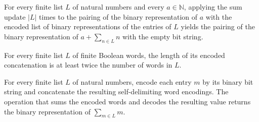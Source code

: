 \begin{theorem}
\label{Randomized.BPLInP.iterate_sumStep_encWords}
\leanok
{}
For every finite list $L$ of natural numbers and every $a\in\mathbb N$, applying the sum
update $|L|$ times to the pairing of the binary representation of $a$ with the encoded
list of binary representations of the entries of $L$ yields the pairing of the binary
representation of $a+\sum_{n\in L}n$ with the empty bit string.
\end{theorem}

\begin{theorem}
\label{Randomized.BPLInP.two_mul_length_le_encWords}
\leanok
{}
For every finite list $L$ of finite Boolean words, the length of its encoded
concatenation is at least twice the number of words in $L$.
\end{theorem}

\begin{theorem}
\label{Randomized.BPLInP.sumW_encWords}
\leanok
{}
For every finite list $L$ of natural numbers, encode each entry $m$ by its binary bit
string and concatenate the resulting self-delimiting word encodings. The operation that
sums the encoded words and decodes the resulting value returns the binary representation
of $\sum_{m\in L}m$.
\end{theorem}

